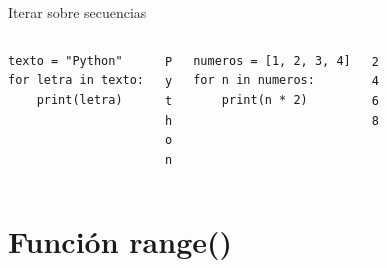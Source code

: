 \documentclass{beamer}
\begin{document}
\begin{frame}[fragile]{Iterar sobre secuencias \faListOl}
\begin{columns}[T]
\begin{lstlisting}
texto = "Python"
for letra in texto:
    print(letra)
\end{lstlisting}

\vspace{-0.2cm}
\begin{tcolorbox}[colback=green!10,colframe=green,title={\small\faArrowCircleRight \ Salida},coltitle=fg0,left=3pt,right=3pt,top=2pt,bottom=2pt,boxsep=1pt]
\small\texttt{P\\
y\\
t\\
h\\
o\\
n}
\end{tcolorbox}

\begin{lstlisting}
numeros = [1, 2, 3, 4]
for n in numeros:
    print(n * 2)
\end{lstlisting}

\vspace{-0.2cm}
\begin{tcolorbox}[colback=green!10,colframe=green,title={\small\faArrowCircleRight \ Salida},coltitle=fg0,left=3pt,right=3pt,top=2pt,bottom=2pt,boxsep=1pt]
\small\texttt{2\\
4\\
6\\
8}
\end{tcolorbox}
\end{columns}
\end{frame}

\section{Función range()}
\end{document}
